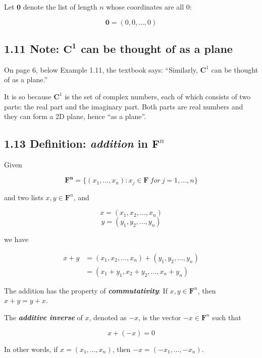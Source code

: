 \documentclass[12pt, letterpaper, oneside]{book}
\begin{document}
Let $\mathbf{0}$ denote the list of length $n$ whose coordinates are all $0$:

\[
  \mathbf{0} = (0, 0, ..., 0)
\]

\subsection{1.11 Note: $\mathbf{C^1}$ can be thought of as a plane}

On page 6, below Example 1.11, the textbook says: ``Similarly, $\mathbf{C}^1$
can be thought of as a plane.''

It is so because $\mathbf{C}^1$ is the set of complex numbers, each of which
consists of two parts: the real part and the imaginary part. Both parts are real
numbers and they can form a 2D plane, hence ``as a plane''.

\subsection{1.13 Definition: \textit{addition} in $\mathbf{F}^n$}

Given

\[
  \mathbf{F^n} = \{(x_1, ..., x_n): x_j \in \mathbf{F} \ for \ j = 1, ..., n\}
\]

and two lists $x, y \in \mathbf{F}^n$, and

\[
  x = (x_1, x_2, ..., x_n)
\]
\[
  y = (y_1, y_2, ..., y_n)
\]

we have

\begin{equation*}
\begin{split}
  x + y &= (x_1, x_2, ..., x_n) + (y_1, y_2, ..., y_n) \\
        &= (x_1 + y_1, x_2 + y_2, ..., x_n + y_n)
\end{split}
\end{equation*}

The addition has the property of \textbf{\textit{commutativity}}: If $x, y \in
\mathbf{F}^n$, then $x + y = y + x$.

The \textbf{\textit{additive inverse}} of $x$, denoted as $-x$, is the vector
$-x \in \mathbf{F}^n$ such that

\[
  x + (-x) = 0
\]

In other words, if $x = (x_1, ..., x_n)$, then $-x = (-x_1, ..., -x_n)$.

\end{document}
